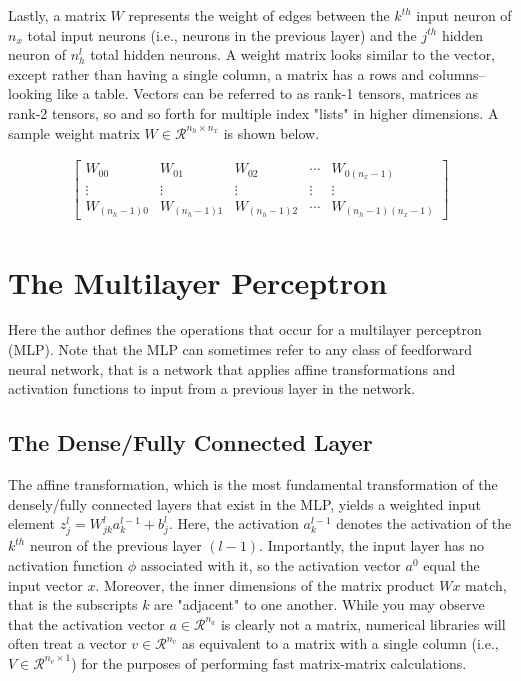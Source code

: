 \documentclass{article}
\begin{document}
Lastly, a matrix $W$ represents the weight of edges between the $k^{th}$
input neuron of $n_x$ total input neurons (i.e., neurons in the previous layer)
and the $j^{th}$ hidden neuron of $n_h^{l}$ total hidden neurons.
A weight matrix looks similar to the vector, except rather than having a single
column, a matrix has a rows and columns--looking like a table. Vectors can
be referred to as rank-1 tensors, matrices as rank-2 tensors, so and so forth
for multiple index "lists" in higher dimensions. A sample weight matrix
$W \in \mathcal{R}^{n_h \times n_x}$ is
shown below.

\begin{align}
	\begin{bmatrix}
		W_{00}         & W_{01}         & W_{02}         & \cdots & W_{0(n_{x}-1)}         \\
		\vdots         & \vdots         & \vdots         & \vdots & \vdots                 \\
		W_{(n_{h}-1)0} & W_{(n_{h}-1)1} & W_{(n_{h}-1)2} & \cdots & W_{(n_{h}-1)(n_{x}-1)}
	\end{bmatrix}
\end{align}

\section{The Multilayer Perceptron}
\quad Here the author defines the operations that occur for a multilayer perceptron (MLP).
Note that the MLP can sometimes refer to any class of feedforward
neural network, that is a network that applies affine transformations and
activation functions to input from a previous layer in the network.

\subsection{The Dense/Fully Connected Layer}
The affine transformation, which is the most fundamental transformation
of the densely/fully connected layers that exist in the MLP, yields
a weighted input element $z_j^{l} = W_{jk}^{l} a_{k}^{l-1} + b_{j}^{l}$. Here,
the activation $a_k^{l-1}$ denotes the activation of the $k^{th}$ neuron of the
previous layer $(l-1)$. Importantly, the input layer has no activation function $\phi$
associated with it, so the activation vector $a^{0}$ equal the input vector $x$.
Moreover, the inner dimensions of the matrix product
$Wx$ match, that is the subscripts $k$ are "adjacent" to one another. While you may
observe that the activation vector $a \in \mathcal{R}^{n_a}$ is clearly not a matrix,
numerical libraries will often treat a vector $v \in \mathcal{R}^{n_v}$ as equivalent
to a matrix with a single column (i.e., $V \in \mathcal{R}^{n_v \times 1}$) for
the purposes of performing fast matrix-matrix calculations.
\end{document}
